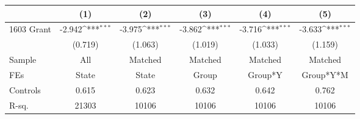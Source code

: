 {
\def\sym#1{\ifmmode^{#1}\else\(^{#1}\)\fi}
\begin{tabular}{l*{5}{c}}
\toprule
                    &\multicolumn{1}{c}{(1)}         &\multicolumn{1}{c}{(2)}         &\multicolumn{1}{c}{(3)}         &\multicolumn{1}{c}{(4)}         &\multicolumn{1}{c}{(5)}         \\
\midrule
1603 Grant          &      -2.942\sym{***}&      -3.975\sym{***}&      -3.862\sym{***}&      -3.716\sym{***}&      -3.633\sym{***}\\
                    &     (0.719)         &     (1.063)         &     (1.019)         &     (1.033)         &     (1.159)         \\
\midrule
Sample              &         All         &     Matched         &     Matched         &     Matched         &     Matched         \\
FEs                 &       State         &       State         &       Group         &     Group*Y         &   Group*Y*M         \\
Controls            &       0.615         &       0.623         &       0.632         &       0.642         &       0.762         \\
R-sq.               &       21303         &       10106         &       10106         &       10106         &       10106         \\
\bottomrule
\end{tabular}
}

